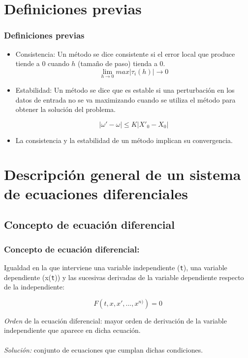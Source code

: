 \documentclass{beamer}
\begin{document}
\section{Definiciones previas}
\begin{frame}
	\frametitle{Definiciones previas}
	
	\begin{itemize}
		\item Consistencia: Un método se dice consistente si el error local que produce tiende a 0 cuando $h$ (tamaño de paso) tienda a 0.
		$$ \lim_{h \rightarrow 0} max | \tau_i(h) | \rightarrow 0 $$
		
		\item Estabilidad: Un método se dice que es estable si una perturbación en los datos de entrada no se va maximizando cuando se utiliza el método para obtener la solución del problema. 
		
		 $$|\omega' - \omega| \leq K|X'_0 - X_0|$$
		
		\item La consistencia y la estabilidad de un método implican su convergencia.
		
	\end{itemize}
\end{frame}

\section{Descripción general de un sistema de ecuaciones diferenciales}
\subsection{Concepto de ecuación diferencial}
\begin{frame}
	\frametitle{Concepto de ecuación diferencial:}
	
	Igualdad en la que interviene una variable independiente (\texttt{t}), una variable dependiente (x(\texttt{t})) y las sucesivas derivadas de la variable dependiente respecto de la independiente:
	
	$$
	F(t,x,x', ..., x^{n)})=0
	$$
	
	\textit{Orden} de la ecuación diferencial: mayor orden de derivación de la variable independiente que aparece en dicha ecuación.\\~\\
	
	\textit{Solución:} conjunto de ecuaciones que cumplan dichas condiciones.
\end{frame}
\end{document}

